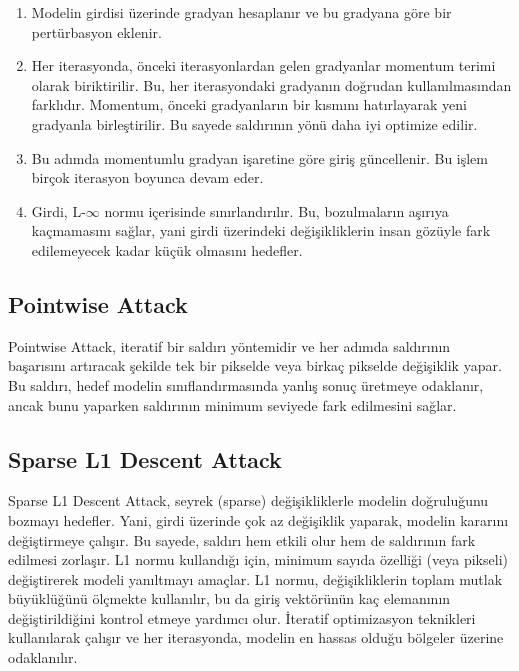 \begin{enumerate}
    \item Modelin girdisi üzerinde gradyan hesaplanır ve bu gradyana göre bir pertürbasyon eklenir.
    \item Her iterasyonda, önceki iterasyonlardan gelen gradyanlar momentum terimi olarak biriktirilir. Bu, her iterasyondaki gradyanın doğrudan kullanılmasından farklıdır. Momentum, önceki gradyanların bir kısmını hatırlayarak yeni gradyanla birleştirilir. Bu sayede saldırının yönü daha iyi optimize edilir.
    \item Bu adımda momentumlu gradyan işaretine göre giriş güncellenir. Bu işlem birçok iterasyon boyunca devam eder.
    \item Girdi, L-$\infty$ normu içerisinde sınırlandırılır. Bu, bozulmaların aşırıya kaçmamasını sağlar, yani girdi üzerindeki değişikliklerin insan gözüyle fark edilemeyecek kadar küçük olmasını hedefler.
\end{enumerate}

\newpage

\subsection{Pointwise Attack}

Pointwise Attack, iteratif bir saldırı yöntemidir ve her adımda saldırının başarısını artıracak şekilde tek bir pikselde veya birkaç pikselde değişiklik yapar. Bu saldırı, hedef modelin sınıflandırmasında yanlış sonuç üretmeye odaklanır, ancak bunu yaparken saldırının minimum seviyede fark edilmesini sağlar.

\newpage

\subsection{Sparse L1 Descent Attack}

Sparse L1 Descent Attack, seyrek (sparse) değişikliklerle modelin doğruluğunu bozmayı hedefler. Yani, girdi üzerinde çok az değişiklik yaparak, modelin kararını değiştirmeye çalışır. Bu sayede, saldırı hem etkili olur hem de saldırının fark edilmesi zorlaşır. L1 normu kullandığı için, minimum sayıda özelliği (veya pikseli) değiştirerek modeli yanıltmayı amaçlar. L1 normu, değişikliklerin toplam mutlak büyüklüğünü ölçmekte kullanılır, bu da giriş vektörünün kaç elemanının değiştirildiğini kontrol etmeye yardımcı olur. İteratif optimizasyon teknikleri kullanılarak çalışır ve her iterasyonda, modelin en hassas olduğu bölgeler üzerine odaklanılır.

